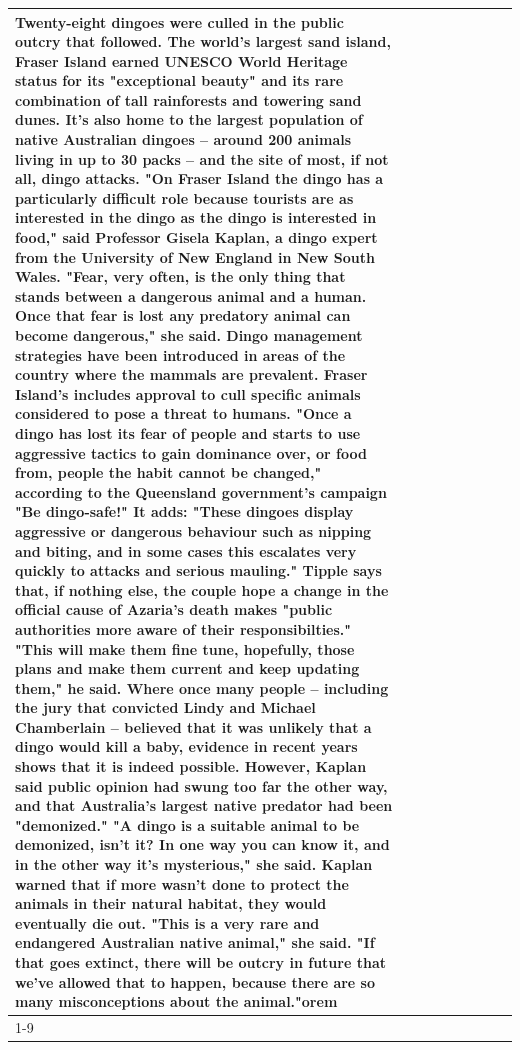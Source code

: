 \begin{table}[H]
\begin{tabular}{lllrlllll}
Twenty-eight dingoes were culled in the public outcry that followed. The world's largest sand island, Fraser Island earned UNESCO World Heritage status for its "exceptional beauty" and its rare combination of tall rainforests and towering sand dunes. It's also home to the largest population of native Australian dingoes -- around 200 animals living in up to 30 packs -- and the site of most, if not all, dingo attacks. "On Fraser Island the dingo has a particularly difficult role because tourists are as interested in the dingo as the dingo is interested in food," said Professor Gisela Kaplan, a dingo expert from the University of New England in New South Wales. "Fear, very often, is the only thing that stands between a dangerous animal and a human. Once that fear is lost any predatory animal can become dangerous," she said. Dingo management strategies have been introduced in areas of the country where the mammals are prevalent. Fraser Island's includes approval to cull specific animals considered to pose a threat to humans. "Once a dingo has lost its fear of people and starts to use aggressive tactics to gain dominance over, or food from, people the habit cannot be changed," according to the Queensland government's campaign "Be dingo-safe!" It adds: "These dingoes display aggressive or dangerous behaviour such as nipping and biting, and in some cases this escalates very quickly to attacks and serious mauling." Tipple says that, if nothing else, the couple hope a change in the official cause of Azaria's death makes "public authorities more aware of their responsibilties." "This will make them fine tune, hopefully, those plans and make them current and keep updating them," he said. Where once many people -- including the jury that convicted Lindy and Michael Chamberlain -- believed that it was unlikely that a dingo would kill a baby, evidence in recent years shows that it is indeed possible. However, Kaplan said public opinion had swung too far the other way, and that Australia's largest native predator had been "demonized." "A dingo is a suitable animal to be demonized, isn't it? In one way you can know it, and in the other way it's mysterious," she said. Kaplan warned that if more wasn't done to protect the animals in their natural habitat, they would eventually die out. "This is a very rare and endangered Australian native animal," she said. "If that goes extinct, there will be outcry in future that we've allowed that to happen, because there are so many misconceptions about the animal."orem \\
\cline{1-9}

\end{tabular}
\end{table}
